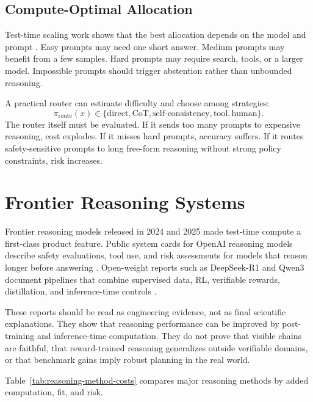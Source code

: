 \subsection{Compute-Optimal Allocation}
Test-time scaling work shows that the best allocation depends on the model and prompt \cite{snell2024scaling,chen2025reasoning,yang2025testtime}. Easy prompts may need one short answer. Medium prompts may benefit from a few samples. Hard prompts may require search, tools, or a larger model. Impossible prompts should trigger abstention rather than unbounded reasoning.

A practical router can estimate difficulty and choose among strategies:
\[
    \pi_{\mathrm{route}}(x)
    \in
    \{\text{direct},\text{CoT},\text{self-consistency},\text{tool},\text{human}\}.
\]
The router itself must be evaluated. If it sends too many prompts to expensive reasoning, cost explodes. If it misses hard prompts, accuracy suffers. If it routes safety-sensitive prompts to long free-form reasoning without strong policy constraints, risk increases.

\section{Frontier Reasoning Systems}
Frontier reasoning models released in 2024 and 2025 made test-time compute a first-class product feature. Public system cards for OpenAI reasoning models describe safety evaluations, tool use, and risk assessments for models that reason longer before answering \cite{openai2025o3o4mini}. Open-weight reports such as DeepSeek-R1 and Qwen3 document pipelines that combine supervised data, RL, verifiable rewards, distillation, and inference-time controls \cite{deepseek2025r1,yang2025qwen3}.

These reports should be read as engineering evidence, not as final scientific explanations. They show that reasoning performance can be improved by post-training and inference-time computation. They do not prove that visible chains are faithful, that reward-trained reasoning generalizes outside verifiable domains, or that benchmark gains imply robust planning in the real world.

Table~\ref{tab:reasoning-method-costs} compares major reasoning methods by added computation, fit, and risk.

